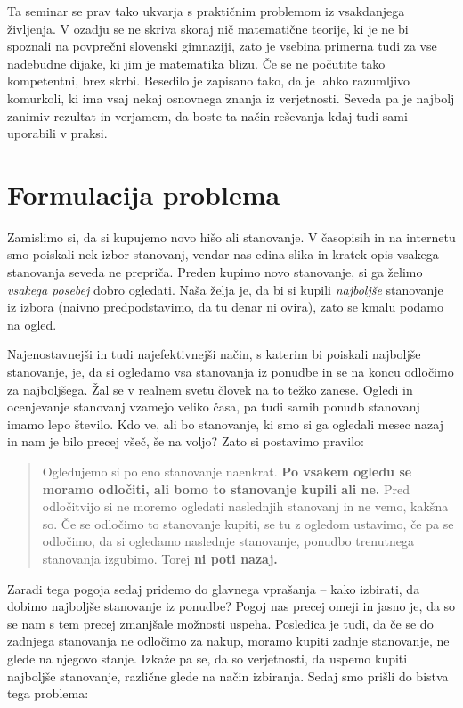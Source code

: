 \documentclass[a4paper, 12pt, titlepage]{article}
\begin{document}
Ta seminar se prav tako ukvarja s praktičnim problemom iz vsakdanjega življenja. V ozadju se ne skriva skoraj nič matematične teorije, ki je ne bi spoznali na povprečni slovenski gimnaziji, zato je vsebina primerna tudi za vse nadebudne dijake, ki jim je matematika blizu. Če se ne počutite tako kompetentni, brez skrbi. Besedilo je zapisano tako, da je lahko razumljivo komurkoli, ki ima vsaj nekaj osnovnega znanja iz verjetnosti. Seveda pa je najbolj zanimiv rezultat in verjamem, da boste ta način reševanja kdaj tudi sami uporabili v praksi.

\newpage
\section{Formulacija problema}

Zamislimo si, da si kupujemo novo hišo ali stanovanje. V časopisih in na internetu smo poiskali nek izbor stanovanj, vendar nas edina slika in kratek opis vsakega stanovanja seveda ne prepriča. Preden kupimo novo stanovanje, si ga želimo \emph{vsakega posebej} dobro ogledati. Naša želja je, da bi si kupili \emph{najboljše} stanovanje iz izbora (naivno predpodstavimo, da tu denar ni ovira), zato se kmalu podamo na ogled.

Najenostavnejši in tudi najefektivnejši način, s katerim bi poiskali najboljše stanovanje, je, da si ogledamo vsa stanovanja iz ponudbe in se na koncu odločimo za najboljšega. Žal se v realnem svetu človek na to težko zanese. Ogledi in ocenjevanje stanovanj vzamejo veliko časa, pa tudi samih ponudb stanovanj imamo lepo število. Kdo ve, ali bo stanovanje, ki smo si ga ogledali mesec nazaj in nam je bilo precej všeč, še na voljo? Zato si postavimo pravilo:

\begin{quote}
Ogledujemo si po eno stanovanje naenkrat. \textbf{Po vsakem ogledu se moramo odločiti, ali bomo to stanovanje kupili ali ne.} Pred odločitvijo si ne moremo ogledati naslednjih stanovanj in ne vemo, kakšna so. Če se odločimo to stanovanje kupiti, se tu z ogledom ustavimo, če pa se odločimo, da si ogledamo naslednje stanovanje, ponudbo trenutnega stanovanja izgubimo. Torej \textbf{ni poti nazaj.}
\end{quote}
\label{pogoj_za_nakup}

Zaradi tega pogoja sedaj pridemo do glavnega vprašanja -- kako izbirati, da dobimo najboljše stanovanje iz ponudbe? Pogoj nas precej omeji in jasno je, da so se nam s tem precej zmanjšale možnosti uspeha. Posledica je tudi, da če se do zadnjega stanovanja ne odločimo za nakup, moramo kupiti zadnje stanovanje, ne glede na njegovo stanje. Izkaže pa se, da so verjetnosti, da uspemo kupiti najboljše stanovanje, različne glede na način izbiranja. Sedaj smo prišli do bistva tega problema:
\end{document}
